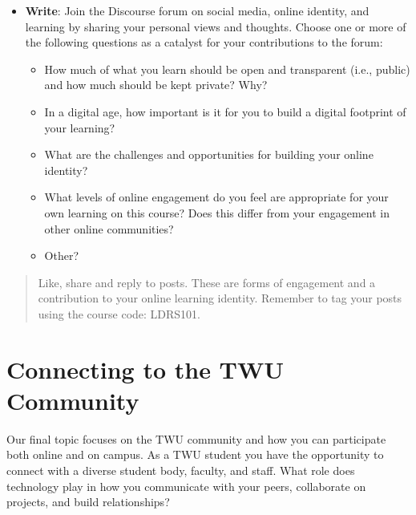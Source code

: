 \documentclass[
  letterpaper,
  DIV=11,
  numbers=noendperiod]{scrreprt}
\providecommand{\tightlist}{%
  \setlength{\itemsep}{0pt}\setlength{\parskip}{0pt}}\usepackage{longtable,booktabs,array}
\begin{document}
\begin{tcolorbox}[enhanced jigsaw, toprule=.15mm, colback=white, colframe=quarto-callout-note-color-frame, bottomtitle=1mm, leftrule=.75mm, coltitle=black, titlerule=0mm, rightrule=.15mm, colbacktitle=quarto-callout-note-color!10!white, left=2mm, title={Learning Activity}, opacitybacktitle=0.6, opacityback=0, breakable, toptitle=1mm, arc=.35mm, bottomrule=.15mm]

\begin{itemize}
\tightlist
\item
  \textbf{Write}: Join the Discourse forum on social media, online
  identity, and learning by sharing your personal views and thoughts.
  Choose one or more of the following questions as a catalyst for your
  contributions to the forum:

  \begin{itemize}
  \tightlist
  \item
    How much of what you learn should be open and transparent (i.e.,
    public) and how much should be kept private? Why?
  \item
    In a digital age, how important is it for you to build a digital
    footprint of your learning?
  \item
    What are the challenges and opportunities for building your online
    identity?
  \item
    What levels of online engagement do you feel are appropriate for
    your own learning on this course? Does this differ from your
    engagement in other online communities?
  \item
    Other?
  \end{itemize}
\end{itemize}

\begin{quote}
Like, share and reply to posts. These are forms of engagement and a
contribution to your online learning identity. Remember to tag your
posts using the course code: LDRS101.
\end{quote}

\end{tcolorbox}

\section{Connecting to the TWU
Community}\label{connecting-to-the-twu-community}

Our final topic focuses on the TWU community and how you can participate
both online and on campus. As a TWU student you have the opportunity to
connect with a diverse student body, faculty, and staff. What role does
technology play in how you communicate with your peers, collaborate on
projects, and build relationships?
\end{document}
